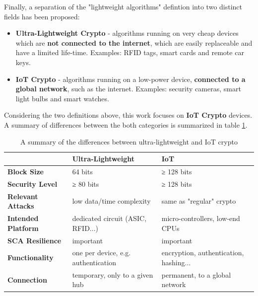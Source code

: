 \documentclass{llncs}
\begin{document}
Finally, a separation of the "lightweight algorithms" defintion into two
distinct fields has been proposed:

\begin{itemize}
  \item \textbf{Ultra-Lightweight Crypto} - algorithms running on very cheap
  devices which are \textbf{not connected to the internet}, which are easily replaceable
  and have a limited life-time. Examples: RFID tags, smart cards and remote car keys.
  \item \textbf{IoT Crypto} - algorithms running on a low-power device,
  \textbf{connected to a global network}, such as the internet. Examples: security cameras,
  smart light bulbs and smart watches.
\end{itemize}

Considering the two definitions above, this work focuses on \textbf{IoT Crypto}
devices. A summary of differences between the both categories is summarized in
table \ref{ul-iot}.

\begin{table}[]
\centering
\caption{A summary of the differences between ultra-lightweight and IoT crypto}
\label{ul-iot}
\begin{tabular}{@{}lll@{}}
\toprule
                           & \textbf{Ultra-Lightweight}          & \textbf{IoT}                           \\ \midrule
\textbf{Block Size}        & 64 bits                             & ≥ 128 bits                             \\
\textbf{Security Level}    & ≥ 80 bits                           & ≥ 128 bits                             \\
\textbf{Relevant Attacks}  & low data/time complexity            & same as "regular" crypto               \\
\textbf{Intended Platform} & dedicated circuit (ASIC, RFID...)   & micro-controllers, low-end CPUs        \\
\textbf{SCA Resilience}    & important                           & important                              \\
\textbf{Functionality}     & one per device, e.g. authentication & encryption, authentication, hashing... \\
\textbf{Connection}        & temporary, only to a given hub      & permanent, to a global network         \\ \bottomrule
\end{tabular}
\end{table}
\end{document}
